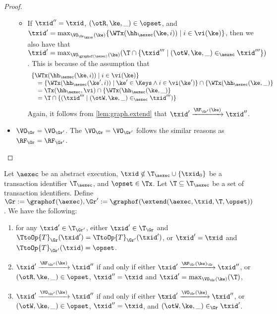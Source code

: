 \begin{proof}
\begin{itemize}
\begin{itemize}
\item If $\txid'' = \txid$, $(\otR, \ke, \_) \in \opset$, and $\txid' = \max_{\VO_{\Gr_\mkvs}(\ke)} \{ \WTx(\hh_{\aexec}(\ke, i)) \mid i \in \vi(\ke)\}$, 
then we also have that $\txid' = \max_{\VO_{\graphof(\aexec)}(\ke)} (\T \cap \{ \txid''' \mid (\otW, \ke, \_) \in_{\aexec} \txid'''\}) $. 
This is because of the assumption that 
\[
\begin{array}{l}
\{\WTx(\hh_{\aexec}(\ke, i)) \mid i \in \vi(\ke)\}  \\
\quad = \{\WTx(\hh_{\aexec}(\ke', i)) \mid \ke' \in \Keys \wedge i \in \vi(\ke')\} \cap \{\WTx(\hh_{\aexec}(\ke, \_)\} \\
\quad = \Tx(\hh_{\aexec}, \vi) \cap \{\WTx(\hh_{\aexec}(\ke, \_)\}  \\
\quad = \T \cap \{(\txid''' \mid (\otW, \ke, \_) \in_{\aexec} \txid''')\}
\end{array}
\]
Again, it follows from \cref{lem:graph.extend} that $\txid' \xrightarrow{\RF_{\Gr'}(\ke)} \txid''$. 
\end{itemize}
\item \( \VO_{\Gr} = \VO_{\Gr'}\). The \( \VO_{\Gr} = \VO_{\Gr'} \) follows the similar reasons as $\RF_{\Gr} = \RF_{\Gr'}$.
\end{itemize}
\end{proof}

\begin{lemma}
\label{lem:graph.extend}
Let $\aexec$ be an abstract execution, 
$\txid \notin \T_{\aexec} \cup \{\txid_0\}$ be a transaction identifier $\T_{\aexec}$, and $\opset \in \Tx$. 
Let $\T \subseteq \T_{\aexec}$ be a set of transaction identifiers.
Define $\Gr := \graphof(\aexec), \Gr' := \graphof(\extend(\aexec, \txid, \T, \opset))$. 
We have the following: 
\begin{enumerate}
\item for any $\txid' \in \T_{\Gr'}$, either $\txid' \in \T_{\Gr}$ and $\TtoOp{T}_{\Gr}(\txid') = \TtoOp{T}_{\Gr'}(\txid')$, 
or $\txid' = \txid$ and $\TtoOp{T}_{\Gr'}(\txid) = \opset$.
\item $\txid' \xrightarrow{\RF_{\Gr'}(\ke)} \txid''$ if and only if either 
$\txid' \xrightarrow{\RF_{\Gr}(\ke)_{\Gr}} \txid''$, or $(\otR, \ke, \_) \in \opset$, $\txid'' = \txid$ and 
$\txid' = \max_{\VO_{\Gr}(\ke)}(\T)$, 
\item $\txid' \xrightarrow{\VO_{\Gr'}(\ke)} \txid''$ if and only if 
either $\txid' \xrightarrow{\VO_{\Gr}(\ke)} \txid''$, or $(\otW, \ke, \_) \in \opset$, $\txid'' = \txid$, 
and $(\otW, \ke, \_) \in_{\Gr} \txid'$.
\end{enumerate}
\end{lemma}

